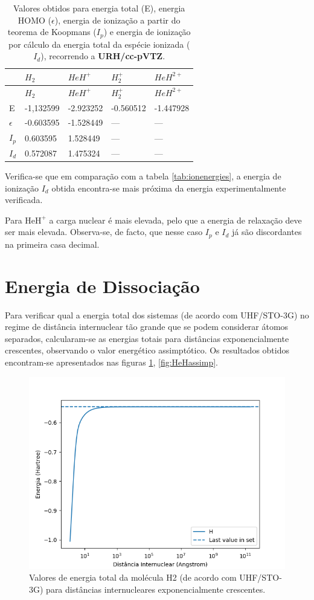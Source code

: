 \documentclass[portuguese,]{article}
\begin{document}
\begin{longtable}[]{@{}lllll@{}}
\caption{Valores obtidos para energia total (E), energia HOMO
(\(\epsilon\)), energia de ionização a partir do teorema de Koopmans
(\(I_p\)) e energia de ionização por cálculo da energia total da espécie
ionizada (\(I_d\)), recorrendo a \textbf{URH/cc-pVTZ}.
\label{tab:ccpvtz}}\tabularnewline
\toprule
& \(H_2\) & \(HeH^+\) & \(H_2^+\) & \(HeH^{2+}\)\tabularnewline
\midrule
\endfirsthead
\toprule
& \(H_2\) & \(HeH^+\) & \(H_2^+\) & \(HeH^{2+}\)\tabularnewline
\midrule
\endhead
E & -1,132599 & -2.923252 & -0.560512 & -1.447928\tabularnewline
\(\epsilon\) & -0.603595 & -1.528449 & --- & ---\tabularnewline
\(I_p\) & 0.603595 & 1.528449 & --- & ---\tabularnewline
\(I_d\) & 0.572087 & 1.475324 & --- & ---\tabularnewline
\bottomrule
\end{longtable}

Verifica-se que em comparação com a tabela \ref{tab:ionenergies}, a
energia de ionização \(I_d\) obtida encontra-se mais próxima da energia
experimentalmente verificada.

Para \(\text{HeH}^+\) a carga nuclear é mais elevada, pelo que a energia
de relaxação deve ser mais elevada. Observa-se, de facto, que nesse caso
\(I_p\) e \(I_d\) já são discordantes na primeira casa decimal.

\hypertarget{energia-de-dissociauxe7uxe3o}{%
\section{Energia de Dissociação}\label{energia-de-dissociauxe7uxe3o}}

Para verificar qual a energia total dos sistemas (de acordo com
UHF/STO-3G) no regime de distância internuclear tão grande que se podem
considerar átomos separados, calcularam-se as energias totais para
distâncias exponencialmente crescentes, observando o valor energético
assimptótico. Os resultados obtidos encontram-se apresentados nas
figuras \ref{fig:Hassimp}, \ref{fig:HeHassimp}.

\begin{figure}
\centering
\includegraphics{bits/figures/H.png}
\caption{Valores de energia total da molécula H2 (de acordo com
UHF/STO-3G) para distâncias internucleares exponencialmente crescentes.
\label{fig:Hassimp}}
\end{figure}
\end{document}

